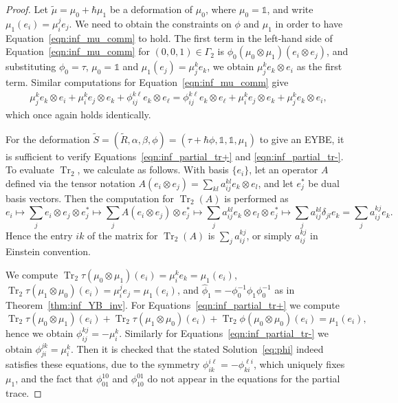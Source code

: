 \documentclass[11pt,fleqn]{amsart} %
\DeclareMathOperator{\tr}{Tr}
\begin{document}
\begin{proof}
	 Let $\tilde \mu = \mu_0 + \hbar \mu_1 $ be a deformation of $\mu_0$,
			 where $\mu_0=\mathbb 1$, and write $\mu_1(e_i) = \mu_i^je_j$. 
			We need  to obtain the constraints on $\phi$ and $\mu_1$ in order to have Equation~\eqref{eqn:inf_mu_comm} to hold. 
			The first term in the left-hand side of Equation~\eqref{eqn:inf_mu_comm}   
			for $(0,0,1) \in \Gamma_2$ is 
		$\phi_0( \mu_0 \otimes \mu_1)(e_i \otimes e_j )$, and substituting $\phi_0=\tau$, $\mu_0=\mathbb 1$
		and $\mu_1 (e_j ) = \mu_j^k e_k $, we obtain $\mu_j^k e_k\otimes e_i$ as the first term. 
					Similar computations for  Equation~\eqref{eqn:inf_mu_comm}  give  
			\begin{eqnarray*}
					\mu_j^k e_k\otimes e_i + \mu_i^k e_j\otimes e_k + \phi_{ij}^{k\ell}e_k\otimes e_{\ell} = \phi_{ij}^{k\ell}e_k\otimes e_{\ell} + \mu_i^ke_j\otimes e_k + \mu_j^ke_k\otimes e_i,
			\end{eqnarray*}
			which once again holds identically. 
			
			For the deformation
			$\tilde S=(\tilde R, \alpha, \beta, \phi)=(\tau+\hbar \phi, \mathbb 1, \mathbb 1, \mu_1)$ to give 
			an EYBE, it is sufficient to verify Equations~\eqref{eqn:inf_partial_tr+} and \eqref{eqn:inf_partial_tr-}.
			To evaluate $\tr_2$, we calculate as follows.
			With basis $\{ e_i \}$,  let an operator $A$ defined via the tensor notation   
			$A(e_i\otimes e_j) = \sum_{kl} a_{ij}^{kl}e_k\otimes e_l$,  
			and let $e_j^*$ be  dual basis vectors. 
			Then the  computation for $\tr_2(A)$ is performed as  
			$$ e_i \mapsto \sum_j e_i\otimes e_j\otimes e_j^* 
			\mapsto \sum_j A(e_i\otimes e_j)\otimes e_j^* 
			\mapsto \sum_j a_{ij}^{kl} e_k\otimes e_l \otimes e^*_j 
			\mapsto \sum_j a_{ij}^{kl}\delta_{jl} e_k 
			=  \sum_j a_{ij}^{kj} e_k.  $$
			Hence the entry $ik$ of the matrix for $\tr_2(A)$ is $ \sum_j a_{ij}^{kj} $, 
		    or simply $a_{ij}^{kj}$ in Einstein convention. 
	
		
			We compute 
			$\tr_2 \tau(\mu_0\otimes \mu_1)(e_i) =  \mu_i^ke_k = \mu_1(e_i)$, 
			$\tr_2 \tau(\mu_1\otimes \mu_0)(e_i) =   \mu_i^je_j = \mu_1(e_i)$, 
and 
			 $\hat \phi_1 = -\phi_0^{-1}\phi_1\phi_0^{-1}$  as in Theorem~\ref{thm:inf_YB_inv}. 
			For Equations~\eqref{eqn:inf_partial_tr+} we compute
			$$\tr_2 \tau(\mu_0\otimes \mu_1)(e_i) + \tr_2 \tau(\mu_1\otimes \mu_0)(e_i) + \tr_2 \phi(\mu_0\otimes \mu_0)(e_i) =\mu_1 (e_i), $$
			 hence we obtain $ \phi_{ij}^{kj} = - \mu_i^k$.
			Similarly for  Equations~\eqref{eqn:inf_partial_tr-} we obtain $ \phi_{ji}^{jk} = \mu_i^k$.
			Then it is checked that the 
			 stated Solution~\eqref{eq:phi} 
			indeed satisfies these equations, due to the symmetry $\phi_{ik}^{i\ell} = - \phi_{ki}^{\ell i}$, which uniquely fixes $\mu_1$, and the fact that $\phi_{01}^{10}$ and $\phi_{10}^{01}$ do not appear in the equations for the partial trace.
\end{proof}
	
\end{document}
